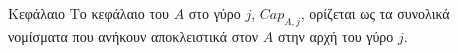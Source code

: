 {}
\begin{definitiongr}{Κεφάλαιο}
  Το κεφάλαιο του $A$ στο γύρο $j$, $Cap_{A, j}$, ορίζεται ως τα συνολικά νομίσματα που ανήκουν αποκλειστικά στον $A$ στην
  αρχή του γύρο $j$.
\end{definitiongr}
